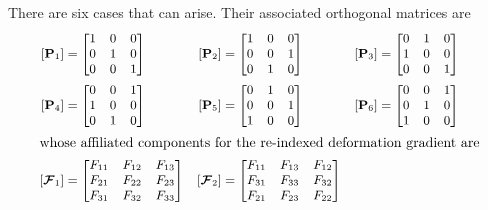 There are six cases that can arise.  Their associated orthogonal matrices are
\begin{subequations}
    \small
    \begin{align}
    [ \mathbf{P}_1 ] & = \begin{bmatrix}
    1 & 0 & 0\\
    0 & 1 & 0\\
    0 & 0 & 1
    \end{bmatrix} & 
    [ \mathbf{P}_2 ] & = \begin{bmatrix}
    1 & 0 & 0\\
    0 & 0 & 1\\
    0 & 1 & 0
    \end{bmatrix} &
    [ \mathbf{P}_3 ] & = \begin{bmatrix}
    0 & 1 & 0\\
    1 & 0 & 0\\
    0 & 0 & 1
    \end{bmatrix} \notag \\
    [ \mathbf{P}_4 ] & = 
    \begin{bmatrix}
    0 & 0 & 1\\
    1 & 0 & 0\\
    0 & 1 & 0
    \end{bmatrix} & 
    [ \mathbf{P}_5 ] & = \begin{bmatrix}
    0 & 1 & 0\\
    0 & 0 & 1\\
    1 & 0 & 0
    \end{bmatrix} &
    [ \mathbf{P}_6 ] & = \begin{bmatrix}
    0 & 0 & 1\\
    0 & 1 & 0\\
    1 & 0 & 0
    \end{bmatrix} \\ 
    \intertext{\normalsize whose affiliated components for the re-indexed deformation gradient are}
    [ \boldsymbol{\mathcal{F}}_1 ] & = \begin{bmatrix}
    F_{11} & F_{12} & F_{13}\\
    F_{21} & F_{22} & F_{23}\\
    F_{31} & F_{32} & F_{33}
    \end{bmatrix} & 
    [ \boldsymbol{\mathcal{F}}_2 ] & = \begin{bmatrix}
    F_{11} & F_{13} & F_{12}\\
    F_{31} & F_{33} & F_{32}\\
    F_{21} & F_{23} & F_{22}

\end{bmatrix}
\end{align}
\end{subequations}
